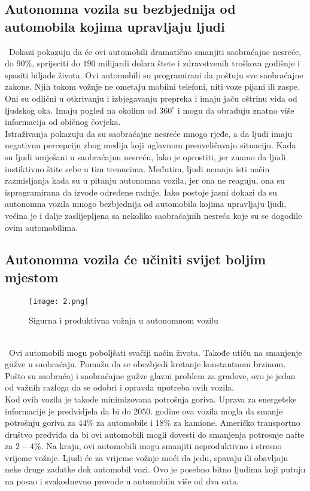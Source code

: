 \documentclass[a4paper]{article}
\begin{document}
{\subsection{Autonomna vozila su bezbjednija od \\automobila kojima upravljaju ljudi}
\label{subsec:autonomna vozila su bezbjednija od automobila kojima upravljaju ljudi}
\indent~Dokazi pokazuju da će ovi automobili dramatično smanjiti saobraćajne nesreće, do $90\%$, sprijeciti do $190$  milijardi dolara štete i zdravstvenih troškova godišnje i spasiti hiljade života.\cite{1} Ovi automobili su programirani da poštuju sve saobraćajne zakone. Njih tokom vožnje ne ometaju mobilni telefoni, niti voze pijani ili zaspe. Oni su odlični u otkrivanju i izbjegavanju prepreka i imaju jaču oštrinu  vida od ljudskog oka. Imaju pogled na okolinu od $360^{\circ}$ i mogu da obrađuju znatno više informacija od običnog čovjeka.\\ \indent Istraživanja pokazuju da su saobraćajne nesreće mnogo rjeđe, a da  ljudi imaju negativnu percepciju zbog medija koji uglavnom preuveličavaju situaciju.\cite{2} Kada su ljudi umješani u saobraćajnu nesreću, lako je oprostiti, jer znamo da ljudi instiktivno štite sebe u tim trenucima. Međutim, ljudi nemaju isti način razmisljanja kada su u pitanju autonomna vozila, jer ona ne reaguju, ona su isprogramirana da izvode određene radnje. Iako postoje jasni dokazi da su autonomna vozila mnogo bezbjednija od automobila kojima upravljaju ljudi, većina je i dalje zaslijepljena sa nekoliko saobraćajnih nesreća koje su se dogodile ovim automobilima.

\subsection{Autonomna vozila će učiniti svijet boljim \\mjestom}
\label{subsec:autonomna vozila će učiniti svijet boljim mjestom}
\begin{figure}[h!]
\begin{center}
\texttt{[image: 2.png]}
\label{2}
\caption{Sigurna i produktivna vožnja u autonomnom vozilu}
\end{center}
\end{figure}\\
\indent~Ovi automobili mogu poboljšati svačiji način života. Takođe utiču na smanjenje gužve u saobraćaju.\cite{3} Pomažu da se obezbjedi kretanje konstantnom brzinom. Pošto su saobraćaj i saobraćajne gužve glavni problem za gradove, ovo je jedan od važnih razloga da se odobri i opravda upotreba ovih vozila.\\  
\indent Kod ovih vozila je takođe minimizovana potrošnja goriva. Uprava za energetske informacije je predvidjela da bi do $2050$. godine ova vozila mogla da smanje potrošnju goriva za $44\%$ za automobile i $18\%$ za kamione. Američko transportno društvo predviđa da bi ovi automobili mogli dovesti do smanjenja potrosnje nafte za $2-4\%$.\cite{5} Na kraju, ovi automobili mogu smanjiti neproduktivno i stresno vrijeme vožnje. Ljudi će za vrijeme vožnje moći da jedu, spavaju ili obavljaju neke druge zadatke dok automobil vozi. Ovo je posebno bitno ljudima koji putuju na posao i svakodnevno provode u automobilu više od dva sata.

}
\end{document}
